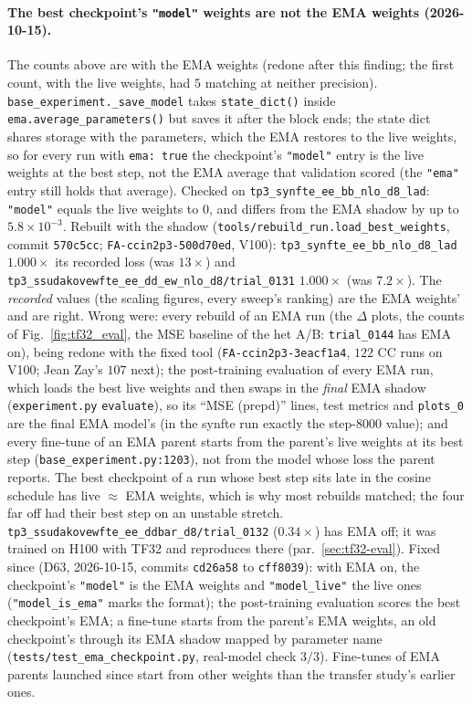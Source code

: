 \documentclass[11pt]{article}
\newcommand{\code}[1]{\texttt{#1}}
\begin{document}
\paragraph{The best checkpoint's \code{"model"} weights are not the EMA weights (2026-10-15).}\label{sec:ema-ckpt}
The counts above are with the EMA weights (redone after this finding; the first count, with the live weights, had $5$
matching at neither precision). \code{base\_experiment.\_save\_model} takes
\code{state\_dict()} inside \code{ema.average\_parameters()} but saves it after the block ends; the state dict shares
storage with the parameters, which the EMA restores to the live weights, so for every run with \code{ema: true} the
checkpoint's \code{"model"} entry is the live weights at the best step, not the EMA average that validation scored (the
\code{"ema"} entry still holds that average). Checked on \code{tp3\_synfte\_ee\_bb\_nlo\_d8\_lad}: \code{"model"} equals
the live weights to $0$, and differs from the EMA shadow by up to $5.8\times10^{-3}$. Rebuilt with the shadow
(\code{tools/rebuild\_run.load\_best\_weights}, commit \code{570c5cc}; \code{FA-ccin2p3-500d70ed}, V100):
\code{tp3\_synfte\_ee\_bb\_nlo\_d8\_lad} $1.000\times$ its recorded loss (was $13\times$) and
\code{tp3\_ssudakovewfte\_ee\_dd\_ew\_nlo\_d8/trial\_0131} $1.000\times$ (was $7.2\times$). The \emph{recorded} values (the
scaling figures, every sweep's ranking) are the EMA weights' and are right. Wrong were: every rebuild of an EMA run (the
$\Delta$ plots, the counts of Fig.~\ref{fig:tf32_eval}, the MSE baseline of the het A/B: \code{trial\_0144} has EMA on),
being redone with the fixed tool (\code{FA-ccin2p3-3eacf1a4}, $122$ CC runs on V100; Jean Zay's $107$ next); the
post-training evaluation of every EMA run, which loads the best live weights and then swaps in the \emph{final} EMA
shadow (\code{experiment.py} \code{evaluate}), so its ``MSE (prepd)'' lines, test metrics and \code{plots\_0} are the
final EMA model's (in the synfte run exactly the step-$8000$ value); and every fine-tune of an EMA parent starts from the
parent's live weights at its best step (\code{base\_experiment.py:1203}), not from the model whose loss the parent
reports. The best checkpoint of a run whose best step sits late in the cosine schedule has live $\approx$ EMA weights,
which is why most rebuilds matched; the four far off had their best step on an unstable stretch.
\code{tp3\_ssudakovewfte\_ee\_ddbar\_d8/trial\_0132} ($0.34\times$) has EMA off; it was trained on H100 with TF32 and
reproduces there (par.~\ref{sec:tf32-eval}). Fixed since (D63, 2026-10-15, commits \code{cd26a58} to \code{cff8039}): with
EMA on, the checkpoint's \code{"model"} is the EMA weights and \code{"model\_live"} the live ones (\code{"model\_is\_ema"}
marks the format); the post-training evaluation scores the best checkpoint's EMA; a fine-tune starts from the parent's
EMA weights, an old checkpoint's through its EMA shadow mapped by parameter name (\code{tests/test\_ema\_checkpoint.py},
real-model check $3/3$). Fine-tunes of EMA parents launched since start from other weights than the transfer study's
earlier ones.
\end{document}
